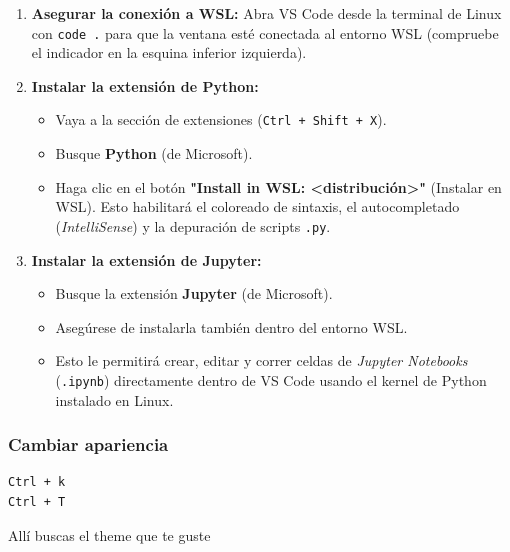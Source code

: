\documentclass[12pt]{article}
\begin{document}
\begin{enumerate}
    \item \textbf{Asegurar la conexión a WSL:}
    Abra VS Code desde la terminal de Linux con \lstinline|code .| para que la ventana 
    esté conectada al entorno WSL (compruebe el indicador en la esquina inferior izquierda).

    \item \textbf{Instalar la extensión de Python:}
    \begin{itemize}
        \item Vaya a la sección de extensiones (\lstinline|Ctrl + Shift + X|).
        \item Busque \textbf{Python} (de Microsoft).
        \item Haga clic en el botón \textbf{"Install in WSL: <distribución>"} (Instalar en WSL).
         Esto habilitará el coloreado de sintaxis, el autocompletado (\textit{IntelliSense}) y la depuración de scripts \lstinline|.py|.
    \end{itemize}

    \item \textbf{Instalar la extensión de Jupyter:}
    \begin{itemize}
        \item Busque la extensión \textbf{Jupyter} (de Microsoft).
        \item Asegúrese de instalarla también dentro del entorno WSL.
        \item Esto le permitirá crear, editar y correr celdas de \textit{Jupyter Notebooks} (\lstinline|.ipynb|) directamente dentro de VS Code usando el kernel de Python instalado en Linux.
    \end{itemize}
\end{enumerate}

\subsubsection*{Cambiar apariencia}
\begin{lstlisting}
Ctrl + k 
Ctrl + T 
\end{lstlisting}
Allí buscas el theme que te guste
\end{document}
